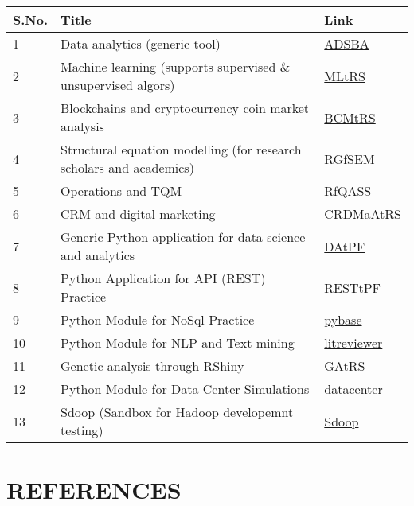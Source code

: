\documentclass[10pt]{article}
\begin{document}
\begin{table}[ht]
\centering 
\begin{tabular}{lll} \hline 
S.No. & Title & Link \\ \hline
1  & Data analytics (generic tool) & \href{https://drmk.shinyapps.io/ADSBA/}{ADSBA} \\
2 & Machine learning (supports supervised \& unsupervised algors) & \href{https://drmk.shinyapps.io/MLTRS/}{MLtRS} \\
3 & Blockchains and cryptocurrency coin market analysis & \href{https://drmk.shinyapps.io/BaCAtRS/}{BCMtRS} \\
4 & Structural equation modelling (for research scholars and academics) & \href{https://github.com/Kamakshaiah/RGfSEM}{RGfSEM}\\
5 & Operations and TQM & \href{https://github.com/Kamakshaiah/RfQASS}{RfQASS} \\
6 & CRM and digital marketing & \href{https://github.com/Kamakshaiah/CRDMaAtRS}{CRDMaAtRS} \\ 
7 & Generic Python application for data science and analytics & \href{https://github.com/Kamakshaiah/DAtPF}{DAtPF} \\
8 & Python Application for API (REST) Practice & \href{https://github.com/Kamakshaiah/RESTtPF}{RESTtPF} \\
9 & Python Module for NoSql Practice & \href{https://github.com/Kamakshaiah/pybase}{pybase} \\
10 & Python Module for NLP and Text mining & \href{https://github.com/Kamakshaiah/literature-review}{litreviewer} \\
11 & Genetic analysis through RShiny & \href{https://github.com/Kamakshaiah/GAtRS}{GAtRS} \\
12 & Python Module for Data Center Simulations & \href{https://github.com/Kamakshaiah/data-center-simulator}{datacenter} \\
13 & Sdoop (Sandbox for Hadoop developemnt testing) & \href{https://github.com/Kamakshaiah/Sdoop}{Sdoop} \\ \hline 

\end{tabular}
\end{table}

\section{\bfseries{REFERENCES}} \hline \vspace{0.5cm}
\end{document}
